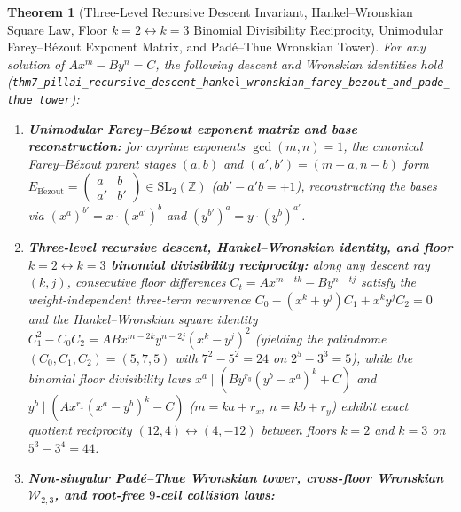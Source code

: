 \documentclass[11pt,a4paper]{article}
\theoremstyle{plain}
\newtheorem{theorem}{Theorem}[section]
\theoremstyle{definition}
\begin{document}
\begin{theorem}[Three-Level Recursive Descent Invariant, Hankel--Wronskian Square Law, Floor $k=2\leftrightarrow k=3$ Binomial Divisibility Reciprocity, Unimodular Farey--B\'ezout Exponent Matrix, and Pad\'e--Thue Wronskian Tower]
\label{thm:main-7}
For any solution of $A x^m - B y^n = C$, the following descent and Wronskian identities hold (\texttt{thm7\_pillai\_recursive\_descent\_hankel\_wronskian\_farey\_bezout\_and\_pade\_thue\_tower}):
\begin{enumerate}[label=\textbf{(\roman*)},leftmargin=*]
\item \textbf{Unimodular Farey--B\'ezout exponent matrix and base reconstruction:}
  for coprime exponents $\gcd(m,n)=1$, the canonical Farey--B\'ezout parent stages $(a,b)$ and $(a',b') = (m-a,n-b)$ form $E_{\mathrm{B\acute{e}zout}} = \begin{pmatrix} a & b \\ a' & b' \end{pmatrix}\in\mathrm{SL}_2(\mathbb{Z})$ ($a b' - a' b = +1$), reconstructing the bases via $(x^a)^{b'} = x\cdot (x^{a'})^b$ and $(y^{b'})^a = y\cdot (y^b)^{a'}$.
\item \textbf{Three-level recursive descent, Hankel--Wronskian identity, and floor $k=2 \leftrightarrow k=3$ binomial divisibility reciprocity:}
  along any descent ray $(k,j)$, consecutive floor differences $C_t = A x^{m-tk} - B y^{n-tj}$ satisfy the weight-independent three-term recurrence $C_0 - (x^k+y^j)C_1 + x^k y^j C_2 = 0$ and the Hankel--Wronskian square identity $C_1^2 - C_0 C_2 = A B x^{m-2k}y^{n-2j}(x^k-y^j)^2$ (yielding the palindrome $(C_0,C_1,C_2) = (5,7,5)$ with $7^2 - 5^2 = 24$ on $2^5 - 3^3 = 5$), while the binomial floor divisibility laws $x^a \mid (B y^{r_y}(y^b-x^a)^k + C)$ and $y^b \mid (A x^{r_x}(x^a-y^b)^k - C)$ ($m = ka+r_x$, $n = kb+r_y$) exhibit exact quotient reciprocity $(12, 4) \leftrightarrow (4, -12)$ between floors $k=2$ and $k=3$ on $5^3 - 3^4 = 44$.
\item \textbf{Non-singular Pad\'e--Thue Wronskian tower, cross-floor Wronskian $\mathcal{W}_{2,3}$, and root-free $9$-cell collision laws:}

\end{enumerate}
\end{theorem}
\end{document}
